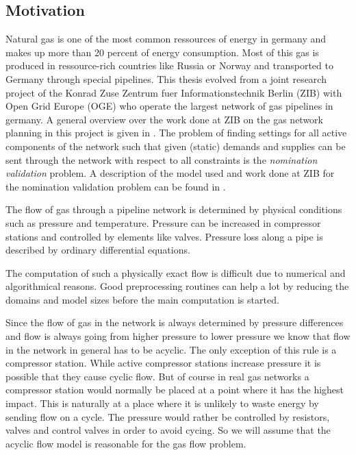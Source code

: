 \subsection{Motivation}
Natural gas is one of the most common ressources of energy in germany and makes up more than 20 percent of energy 
consumption. Most of this gas is produced in ressource-rich countries like Russia or Norway and transported to Germany 
through special pipelines. 
This thesis evolved from a joint research project of the Konrad Zuse Zentrum fuer Informationstechnik Berlin (ZIB) with 
Open Grid Europe (OGE) who operate the largest network of gas pipelines in germany. 
A general overview over the work done at ZIB on the gas network planning in this project is given in 
\cite{FuegenschuhGeisslerGollmeretal.2013}. The problem of finding settings for all active components of the network 
such that given (static) demands and supplies can be sent through the network with respect to all constraints is the 
\textit{nomination validation} problem. A description of the model used and work done at ZIB for the nomination 
validation problem can be found in \cite{PfetschFuegenschuhGeissleretal.2012}. 

The flow of gas through a pipeline network is determined by physical conditions such as pressure and temperature. 
Pressure can be increased in compressor stations and controlled by elements like valves. Pressure loss along a pipe is 
described by ordinary differential equations. 

The computation of such a physically exact flow is difficult due to numerical and algorithmical reasons. Good 
preprocessing routines can help a lot by reducing the domains and model sizes before the main computation is started.

Since the flow of gas in the network is always determined by pressure differences and flow is always going from higher 
pressure to lower pressure we know that flow in the network in general has to be acyclic. The only exception of this 
rule is a compressor station. While  active compressor stations increase
pressure it is possible that they cause cyclic flow. But of course in real gas networks a compressor station would 
normally be placed at a point where it has the highest impact. This is naturally at a place where it is unlikely to 
waste energy by sending flow on a cycle. The pressure would rather be controlled by resistors, valves and control valves 
in order to avoid cycing. So we will assume that the acyclic flow model is reasonable for the gas flow problem.\\

